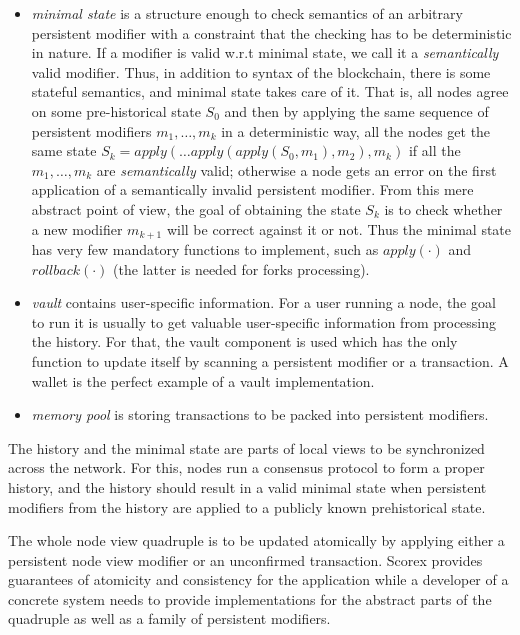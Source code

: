 \begin{itemize}
\item{\em minimal state} is a structure enough to check semantics of an arbitrary persistent modifier with a constraint that the checking has to be deterministic in nature. If a modifier is valid w.r.t minimal state, we call it a {\em semantically} valid modifier.
Thus, in addition to syntax of the blockchain, there is some stateful semantics, and minimal state takes care of it. That is, all nodes agree on some pre-historical state $S_0$ and then by applying the same sequence of persistent modifiers $m_1, \ldots, m_k$ in a deterministic way, all the nodes get the same state $S_k = apply(\ldots apply(apply(S_0, m_1), m_2), m_k)$ if all the $m_1, \ldots, m_k$ are {\em semantically} valid; otherwise a node gets an error on the first application of a semantically invalid persistent modifier. From this mere abstract point of view, the goal of obtaining the state $S_k$ is to check whether a new modifier $m_{k+1}$ will be correct against it or not. Thus the minimal state has very few mandatory functions to implement, such as $apply(\cdot)$ and $rollback(\cdot)$ (the latter is needed for forks processing).

\item{\em vault} contains user-specific information. For a user running a node, the goal to run it is usually to get valuable user-specific information from processing the history. For that, the vault component is used which has the only function to update itself by scanning a persistent modifier or a transaction. A wallet is the perfect example of a vault implementation. 

\item{\em memory pool} is storing transactions to be packed into persistent modifiers.
\end{itemize}

The history and the minimal state are parts of local views to be synchronized across the network. For this, nodes run a consensus protocol to form a proper history, and the history should result in a valid minimal state when persistent modifiers from the history are applied to a publicly known prehistorical state.

The whole node view quadruple is to be updated atomically by applying either a persistent node view modifier or an unconfirmed transaction. Scorex provides guarantees of atomicity and consistency for the application while a developer of a concrete system needs to provide implementations for the abstract parts of the quadruple as well as a family of persistent modifiers.

